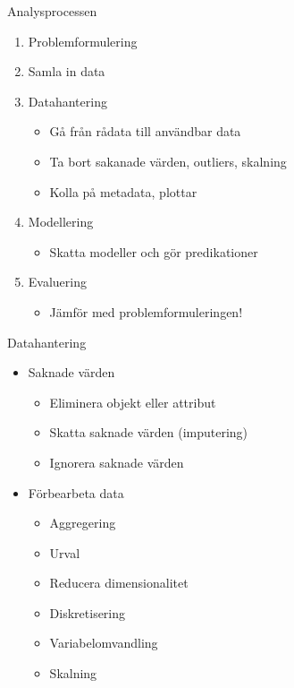 \documentclass[10pt,english]{beamer}
\begin{document}
\begin{frame}{Analysprocessen}
    \begin{enumerate}
        \item Problemformulering
        \item Samla in data
        \item Datahantering
        \begin{itemize}
            \item Gå från rådata till användbar data
            \item Ta bort sakanade värden, outliers, skalning
            \item Kolla på metadata, plottar
        \end{itemize}
        \item Modellering
        \begin{itemize}
            \item Skatta modeller och gör predikationer
        \end{itemize}
        \item Evaluering
        \begin{itemize}
            \item Jämför med problemformuleringen!
        \end{itemize}
    \end{enumerate}
\end{frame}

\begin{frame}{Datahantering}
    \begin{itemize}
        \item Saknade värden
        \begin{itemize}
            \item Eliminera objekt eller attribut
            \item Skatta saknade värden (imputering)
            \item Ignorera saknade värden
        \end{itemize}
        \item Förbearbeta data
        \begin{itemize}
            \item Aggregering
            \item Urval
            \item Reducera dimensionalitet
            \item Diskretisering
            \item Variabelomvandling
            \item Skalning
        \end{itemize}
    \end{itemize}
\end{frame}
\end{document}
